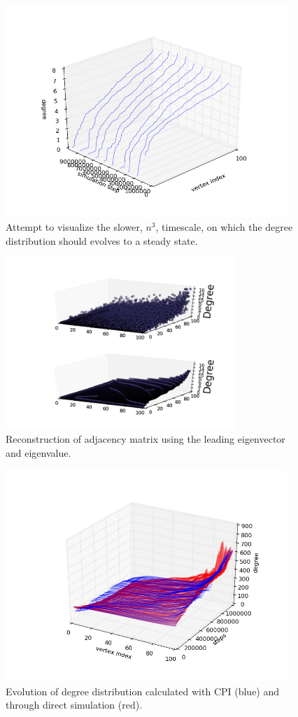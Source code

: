 \documentclass[11pt]{article}
\begin{document}
\begin{figure}[h!]
  \centering
  \includegraphics[height=80mm]{erCubicTimescale}
  \caption{Attempt to visualize the slower, $n^{3}$, timescale, on which the degree distribution should evolves to a steady state.}
  \label{fig:erSlow}
\end{figure}

\begin{figure}[h!]
  \centering
  \includegraphics[height=65mm]{erRecon}
  \caption{Reconstruction of adjacency matrix using the leading eigenvector and eigenvalue.}
  \label{fig:erRecon}
\end{figure}

\begin{figure}[h!]
  \centering
  \includegraphics[height=80mm]{erCPI}
  \caption{Evolution of degree distribution calculated with CPI (blue) and through direct simulation (red).}
  \label{fig:erCPI}
\end{figure}
\end{document}
